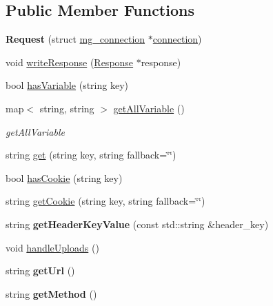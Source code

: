 \subsection*{Public Member Functions}
\begin{DoxyCompactItemize}
\item 
{\bfseries Request} (struct \hyperlink{structmg__connection}{mg\+\_\+connection} $\ast$\hyperlink{structconnection}{connection})\hypertarget{classMongoose_1_1Request_af87c796da3723539ff2ec461093314c8}{}\label{classMongoose_1_1Request_af87c796da3723539ff2ec461093314c8}

\item 
void \hyperlink{classMongoose_1_1Request_aae08d8c042ca9900345e32ea5c09c937}{write\+Response} (\hyperlink{classMongoose_1_1Response}{Response} $\ast$response)
\item 
bool \hyperlink{classMongoose_1_1Request_a241238c4dcdea148c7c4469172e1fcac}{has\+Variable} (string key)
\item 
map$<$ string, string $>$ \hyperlink{classMongoose_1_1Request_aa63e36f0cd8c4a7a17d32cc92b95d14e}{get\+All\+Variable} ()
\begin{DoxyCompactList}\small\item\em get\+All\+Variable \end{DoxyCompactList}\item 
string \hyperlink{classMongoose_1_1Request_a8ec6685c5beceaabd9281e12d58e678a}{get} (string key, string fallback=\char`\"{}\char`\"{})
\item 
bool \hyperlink{classMongoose_1_1Request_a54d92ec6954d3ab5d5eedb2edc1e11ad}{has\+Cookie} (string key)
\item 
string \hyperlink{classMongoose_1_1Request_acc4953a6996e1fbb81ea08ee37d98f83}{get\+Cookie} (string key, string fallback=\char`\"{}\char`\"{})
\item 
string {\bfseries get\+Header\+Key\+Value} (const std\+::string \&header\+\_\+key)\hypertarget{classMongoose_1_1Request_aa2b476448b8eaeabcae18ae90cb85784}{}\label{classMongoose_1_1Request_aa2b476448b8eaeabcae18ae90cb85784}

\item 
void \hyperlink{classMongoose_1_1Request_a811b74365fe88ce24b255264b4e793ed}{handle\+Uploads} ()
\item 
string {\bfseries get\+Url} ()\hypertarget{classMongoose_1_1Request_aafd1c22f5ab010e735ea5282e4b27c0a}{}\label{classMongoose_1_1Request_aafd1c22f5ab010e735ea5282e4b27c0a}

\item 
string {\bfseries get\+Method} ()\hypertarget{classMongoose_1_1Request_aaca4b474f440dc96b4b50491e3c9dd08}{}\label{classMongoose_1_1Request_aaca4b474f440dc96b4b50491e3c9dd08}


\end{DoxyCompactItemize}
